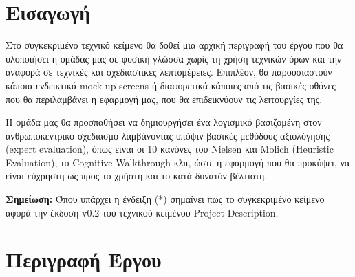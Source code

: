 \documentclass{article}
\begin{document}
{
  \hypersetup{linkcolor=black}
  \tableofcontents
}

\section{Εισαγωγή}
    Στο συγκεκριμένο τεχνικό κείμενο θα δοθεί μια αρχική περιγραφή του έργου που θα υλοποιήσει η ομάδας μας σε φυσική γλώσσα χωρίς τη χρήση τεχνικών όρων και την αναφορά σε τεχνικές και σχεδιαστικές λεπτομέρειες. Επιπλέον, θα παρουσιαστούν κάποια ενδεικτικά mock-up screens ή διαφορετικά κάποιες από τις βασικές οθόνες που θα περιλαμβάνει η εφαρμογή μας, που θα επιδεικνύουν τις λειτουργίες της. \par
    Η ομάδα μας θα προσπαθήσει να δημιουργήσει ένα λογισμικό βασιζομένη στον ανθρωποκεντρικό σχεδιασμό λαμβάνοντας υπόψιν βασικές μεθόδους αξιολόγησης (expert evaluation), όπως είναι οι 10 κανόνες του Nielsen και Molich (Heuristic Evaluation), 
    το Cognitive Walkthrough κλπ, ώστε η εφαρμογή που θα προκύψει, να είναι εύχρηστη ως προς το χρήστη και το κατά δυνατόν βέλτιστη.
    
\vspace{0.3cm}

\textbf{Σημείωση:} Όπου υπάρχει η ένδειξη (*) σημαίνει πως το συγκεκριμένο κείμενο αφορά την έκδοση v0.2 του τεχνικού κειμένου Project-Description.
    

\section{Περιγραφή Έργου}
\end{document}
